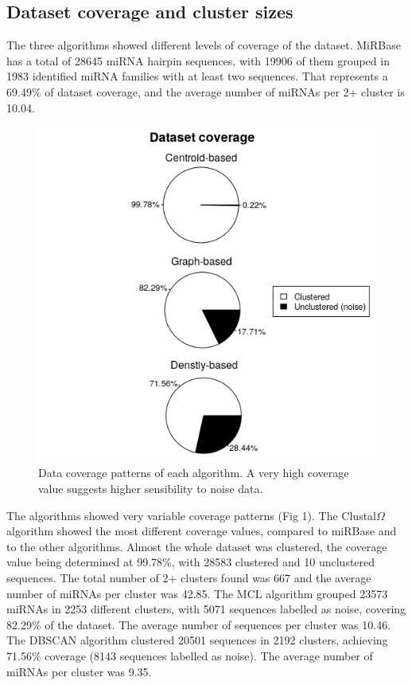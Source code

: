 \documentclass[nocrop]{bioinfo}
\begin{document}
\subsection{Dataset coverage and cluster sizes}
The three algorithms showed different levels of coverage of the dataset. MiRBase has a total of 28645 miRNA hairpin sequences, with 19906 of them grouped in 1983 identified miRNA families with at least two sequences. That represents a 69.49\% of dataset coverage, and the average number of miRNAs per 2+ cluster is 10.04.
\begin{figure}[ht]
\includegraphics[scale=0.45]{img/coverage.png}
\caption{Data coverage patterns of each algorithm. A very high coverage value suggests higher sensibility to noise data.}\label{fig:01}
\end{figure}

The algorithms showed very variable coverage patterns (Fig 1). The Clustal$\Omega$ algorithm showed the most different coverage values, compared to miRBase and to the other algorithms. Almost the whole dataset was clustered, the coverage value being determined at 99.78\%, with 28583 clustered and 10 unclustered sequences. The total number of 2+ clusters found was 667 and the average number of miRNAs per cluster was 42.85. The MCL algorithm grouped 23573 miRNAs in 2253 different clusters, with 5071 sequences labelled as noise, covering 82.29\% of the dataset. The average number of sequences per cluster was 10.46. The DBSCAN algorithm clustered 20501 sequences in 2192 clusters, achieving 71.56\% coverage (8143 sequences labelled as noise). The average number of miRNAs per cluster was 9.35.
\end{document}
